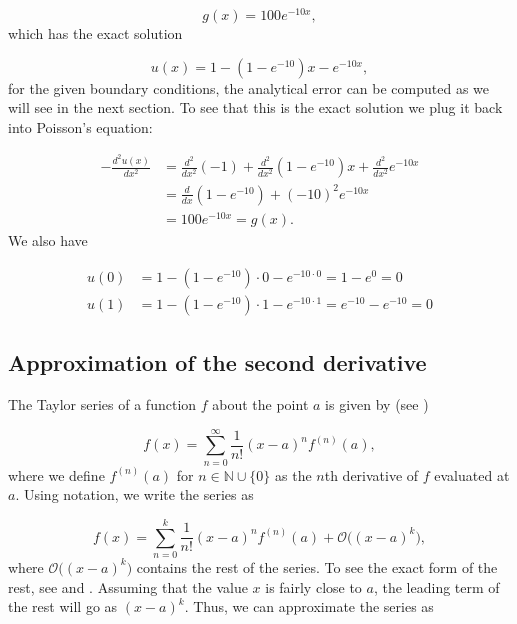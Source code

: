 \documentclass{emulateapj}
\begin{document}
        \begin{equation*}
            g(x) = 100e^{-10x},
        \end{equation*}
        which has the exact solution
        
        \begin{equation*}
            u(x) = 1 - \left(1 - e^{-10}\right)x - e^{-10x},
        \end{equation*}
        for the given boundary conditions, the analytical error can be computed as we will see in the next section. To see that this is the exact solution we plug it back into Poisson's equation:
        
        \begin{align*}
            -\frac{d^{2}u(x)}{dx^{2}} &= 
            \frac{d^{2}}{dx^{2}}(-1) + \frac{d^{2}}{dx^{2}}\left(1 - e^{-10}\right)x + \frac{d^{2}}{dx^{2}}e^{-10x} \\
            &= \frac{d}{dx}\left(1 - e^{-10}\right)+  \left(-10\right)^{2}e^{-10x} \\
            &= 100e^{-10x} = g(x).
        \end{align*}
        We also have 
        
        \begin{align*}
            u(0) &= 1 - \left(1 - e^{-10}\right)\cdot0 - e^{-10\cdot0} 
            = 1 - e^{0} = 0 \\
            u(1) &= 1 - \left(1 - e^{-10}\right)\cdot1 - e^{-10\cdot1} 
            = e^{-10} - e^{-10} = 0 
        \end{align*}
    \subsection{Approximation of the second derivative}
        The Taylor series of a function \(f\) about the point \(a\) is given by (see \cite[Chapter 11]{kalkulus})
        
        \begin{equation*}
            f(x) = \sum_{n=0}^{\infty}\frac{1}{n!}\left(x-a\right)^{n}f^{(n)}(a),
        \end{equation*}
        where we define \(f^{(n)}(a)\) for \(n\in\mathbb{N}\cup\{0\}\) as the \(n\)th derivative of \(f\) evaluated at \(a\). Using  notation, we write the series as
        
        \begin{equation*}
            f(x) = \sum_{n=0}^{k}\frac{1}{n!}\left(x-a\right)^{n}f^{(n)}(a) + \mathcal{O}\big((x-a)^{k}\big),
        \end{equation*}
        where \(\mathcal{O}\big((x-a)^{k}\big)\) contains the rest of the series. To see the exact form of the rest, see \cite[Chapter 11]{kalkulus} and \cite[Chapter 9]{matinf}. Assuming that the value \(x\) is fairly close to \(a\), the leading term of the rest will go as \((x-a)^{k}\). Thus, we can approximate the series as 
        
\end{document}
